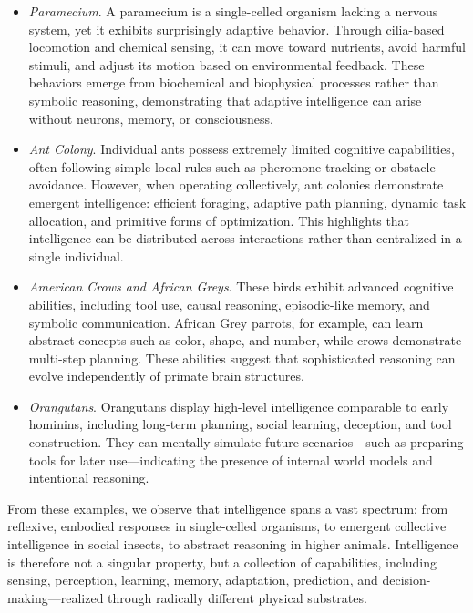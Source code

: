 \documentclass[12pt]{article}
\begin{document}
\begin{itemize}
    \item \textit{Paramecium}. A paramecium is a single-celled organism lacking a nervous system, yet it exhibits surprisingly adaptive behavior. Through cilia-based locomotion and chemical sensing, it can move toward nutrients, avoid harmful stimuli, and adjust its motion based on environmental feedback. These behaviors emerge from biochemical and biophysical processes rather than symbolic reasoning, demonstrating that adaptive intelligence can arise without neurons, memory, or consciousness.

    \item \textit{Ant Colony}. Individual ants possess extremely limited cognitive capabilities, often following simple local rules such as pheromone tracking or obstacle avoidance. However, when operating collectively, ant colonies demonstrate emergent intelligence: efficient foraging, adaptive path planning, dynamic task allocation, and primitive forms of optimization. This highlights that intelligence can be distributed across interactions rather than centralized in a single individual.

    \item \textit{American Crows and African Greys}. These birds exhibit advanced cognitive abilities, including tool use, causal reasoning, episodic-like memory, and symbolic communication. African Grey parrots, for example, can learn abstract concepts such as color, shape, and number, while crows demonstrate multi-step planning. These abilities suggest that sophisticated reasoning can evolve independently of primate brain structures.

    \item \textit{Orangutans}. Orangutans display high-level intelligence comparable to early hominins, including long-term planning, social learning, deception, and tool construction. They can mentally simulate future scenarios—such as preparing tools for later use—indicating the presence of internal world models and intentional reasoning.
\end{itemize}

From these examples, we observe that intelligence spans a vast spectrum: from reflexive, embodied responses in single-celled organisms, to emergent collective intelligence in social insects, to abstract reasoning in higher animals. Intelligence is therefore not a singular property, but a collection of capabilities, including sensing, perception, learning, memory, adaptation, prediction, and decision-making—realized through radically different physical substrates.
\end{document}
